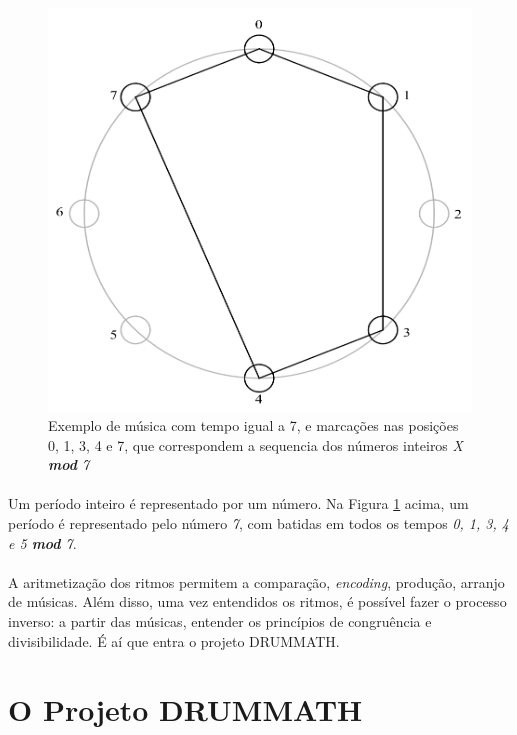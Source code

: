 \documentclass{article}
\begin{document}
	\begin{figure}[h]
		\centering
		\includegraphics[scale=0.7]{7-Cycles}
		\caption{Exemplo de música com tempo igual a 7, e marcações nas posições 0, 1, 3, 4 e 7, que correspondem a sequencia dos números inteiros \textit{X \textbf{mod} 7}}
		\label{Figura-1}
	\end{figure}
	
	\paragraph{}
	Um período inteiro é representado por um número. Na Figura \ref{Figura-1} acima, um período é representado pelo número \textit{7}, com batidas em todos os tempos \textit{0, 1, 3, 4 e 5 \textbf{mod} 7}.
	
	\paragraph{}
	A aritmetização dos ritmos permitem a comparação, \textit{encoding}, produção, arranjo de músicas. Além disso, uma vez entendidos os ritmos, é possível fazer o processo inverso: a partir das músicas, entender os princípios de congruência e divisibilidade. É aí que entra o projeto DRUMMATH.
	
	\section{O Projeto DRUMMATH}
	
\end{document}
